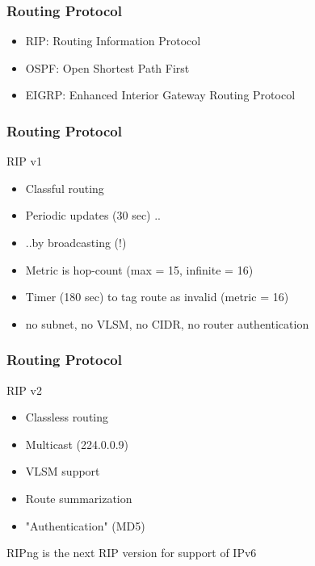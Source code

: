   \begin{frame}
    \frametitle{Routing Protocol}
    \begin{itemize}
      \item RIP: Routing Information Protocol
      \item OSPF: Open Shortest Path First
      \item EIGRP: Enhanced Interior Gateway Routing Protocol
    \end{itemize}
  \end{frame}

  \begin{frame}
    \frametitle{Routing Protocol}
      \begin{block}{RIP v1}
        \begin{itemize}
          \item Classful routing
          \item Periodic updates (30 sec) ..
          \item ..by broadcasting (!)
          \item Metric is hop-count (max = 15, infinite = 16)
          \item Timer (180 sec) to tag route as invalid (metric = 16)
          \item no subnet, no VLSM, no CIDR, no router authentication
        \end{itemize}
      \end{block}
  \end{frame}
  \begin{frame}
    \frametitle{Routing Protocol}
      \begin{block}{RIP v2}
        \begin{itemize}
          \item Classless routing
          \item Multicast (224.0.0.9)
          \item VLSM support
          \item Route summarization
          \item "Authentication" (MD5)
        \end{itemize}
      \end{block}

      \begin{center} RIPng is the next RIP version for support of IPv6 \end{center}
  \end{frame}
